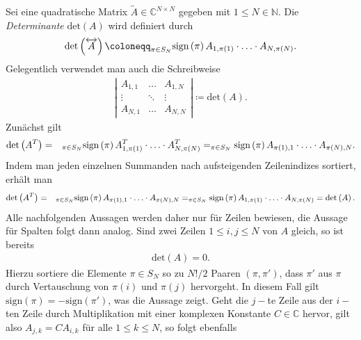 \documentclass{book}
\newcommand{\sign}{\text{sign}}
\renewcommand{\det}{\text{det}}
\let\sum\relax
\DeclareMathOperator*{\sum}{\raisebox{-3.5pt}{\scalebox{2}{\rotatebox{1}{{\bask Σ}}}}}
\begin{document}
Sei eine quadratische Matrix $\overleftrightarrow{A} \in \mathbb{C}^{N \times N}$ gegeben mit $1 \leq N \in \mathbb{N}$. Die \textit{Determinante} $\det\left(A\right)$ wird definiert durch
%
\begin{eqnarray}
\det\left(\overleftrightarrow{A}\right) \coloneqq \sum_{\pi \in S_N}\sign\left(\pi\right)A_{1, \pi\left(1\right)}\cdot\dotsc\cdot A_{N, \pi\left(N\right)}.
\end{eqnarray}
%
Gelegentlich verwendet man auch die Schreibweise
%
\begin{eqnarray}
\left|\begin{array}{ccc}
A_{1, 1} & \dots & A_{1, N} \\
\vdots & \ddots & \vdots \\
A_{N, 1} & \dots & A_{N, N}
\end{array}\right| \coloneqq \det\left(A\right).
\end{eqnarray}
%
Zunächst gilt
%
\begin{eqnarray}
\det\left(A^T\right) & = & \sum_{\pi \in S_N}\sign\left(\pi\right)A^T_{1, \pi\left(1\right)}\cdot\dotsc\cdot A^T_{N, \pi\left(N\right)} = \sum_{\pi \in S_N}\sign\left(\pi\right)A_{\pi\left(1\right), 1}\cdot\dotsc\cdot A_{\pi\left(N\right), N}.
\end{eqnarray}
%
Indem man jeden einzelnen Summanden nach aufsteigenden Zeilenindizes sortiert, erhält man
%
\begin{eqnarray}
\det\left(A^T\right) & = & \sum_{\pi \in S_N}\sign\left(\pi\right)A_{\pi\left(1\right), 1}\cdot\dotsc\cdot A_{\pi\left(N\right), N} = \sum_{\pi \in S_N}\sign\left(\pi\right)A_{1, \pi\left(1\right)}\cdot\dotsc\cdot A_{N, \pi\left(N\right)} = \det\left(A\right).
\end{eqnarray}
%
Alle nachfolgenden Aussagen werden daher nur für Zeilen bewiesen, die Aussage für Spalten folgt dann analog. Sind zwei Zeilen $1 \leq i, j \leq N$ von $A$ gleich, so ist bereits
%
\begin{eqnarray}
\det\left(A\right) = 0.
\end{eqnarray}
%
Hierzu sortiere die Elemente $\pi \in S_N$ so zu $N!/2$ Paaren $\left(\pi, \pi'\right)$, dass $\pi'$ aus $\pi$ durch Vertauschung von $\pi\left(i\right)$ und $\pi\left(j\right)$ hervorgeht. In diesem Fall gilt $\sign\left(\pi\right) = -\sign\left(\pi'\right)$, was die Aussage zeigt. Geht die $j-$te Zeile aus der $i-$ten Zeile durch Multiplikation mit einer komplexen Konstante $C \in \mathbb{C}$ hervor, gilt also $A_{j, k} = CA_{i, k}$ für alle $1 \leq k \leq N$, so folgt ebenfalls
\end{document}
